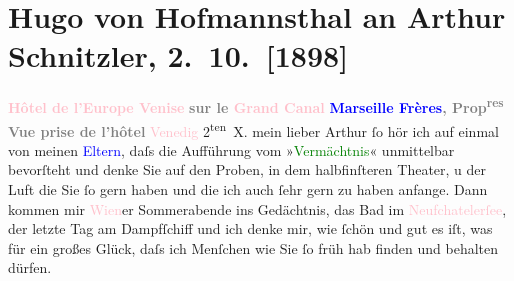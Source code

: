 
               \section[Hugo von Hofmannsthal an Arthur Schnitzler, 2. 10. {[}1898{]}]{ Hugo von Hofmannsthal an Arthur Schnitzler, 2. 10. {[}1898{]}}\nopagebreak{}\rehead{ }\normalsize\beginnumbering{} \toendnotes[C]{\smallbreak\pagebreak[2]} 
\toendnotes[C]{\smallbreak}\pstart
           \noindent{}\centering{}{\pb}\textcolor{gray}{\textbf{\textcolor{pink}{Hôtel de l’Europe Venise}}}\pend
           \pstart
           \noindent{}\centering{}\hspace*{5em}\textcolor{gray}{\textbf{sur le \textcolor{pink}{Grand Canal}}}\pend
           \pstart
           \noindent{}\centering{}\textcolor{gray}{\textbf{\textcolor{blue}{Marseille Frères}, Prop\textsuperscript{res}}}\pend
           \pstart
           \noindent{}\centering{}\textcolor{gray}{\textbf{Vue prise de l’hôtel}}\pend
           \pstart
           \raggedleft{}\textcolor{pink}{Venedig}{ }2\textsuperscript{ten} X.\pend
           \pstart{}mein lieber Arthur\pend\pstart
           ſo hör ich auf einmal von meinen \textcolor{blue}{Eltern}, daſs die Aufführung vom »\textcolor{green}{Vermächtnis}« unmittelbar bevorſteht und denke Sie auf den
                    Proben, in dem halbfinſteren Theater, u der Luft die Sie ſo gern haben und die
                    ich auch ſehr gern zu haben anfange. Dann kommen mir \textcolor{pink}{Wien}er Sommerabende ins Gedächtnis, das Bad im \textcolor{pink}{Neufchatelerſee}, der letzte {\pb}Tag am Dampfſchiff und ich
                    denke mir, wie ſchön und gut es iſt, was für ein großes Glück, daſs ich Menſchen
                    wie Sie ſo früh hab finden und behalten dürfen.\pend
